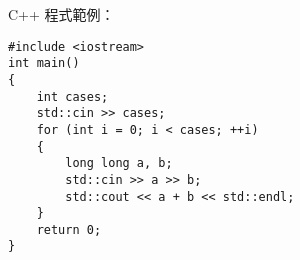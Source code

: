 C++ 程式範例：
\begin{lstlisting}[frame=single]
#include <iostream>
int main()
{
    int cases;
    std::cin >> cases;
    for (int i = 0; i < cases; ++i)
    {
        long long a, b;
        std::cin >> a >> b;
        std::cout << a + b << std::endl;
    }
    return 0;
}
\end{lstlisting}

\clearpage

\clearpage
